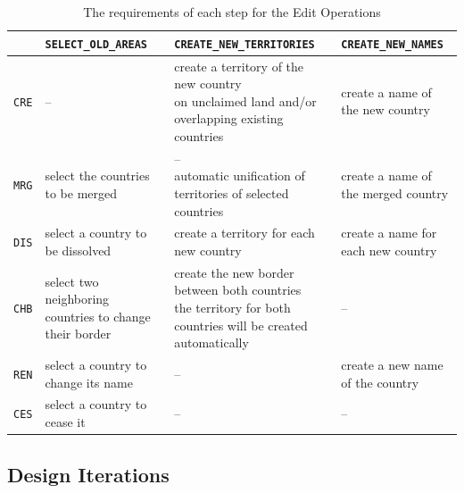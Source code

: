 \begin{table}[H]
\begin{center}
\begin{tabular}{m{0.9cm} m{4.0cm} m{4.4cm} m{3.8cm}}
  \toprule

  &
  \texttt{SELECT\_OLD\_AREAS} &
  \texttt{CREATE\_NEW\_TERRITORIES} &
  \texttt{CREATE\_NEW\_NAMES} \\

  \midrule
  \texttt{CRE} &
  -- &
  \pbox{4.4cm}{create a territory of the new country\\
  \footnotesize{on unclaimed land and/or overlapping existing countries}} &
  create a name of the new country \\

  \midrule
  \texttt{MRG} &
  select the countries to be merged &
  \pbox{4.4cm}{--\\
  \footnotesize{automatic unification of territories of selected countries}} &
  create a name of the merged country
  \\

  \midrule
  \texttt{DIS} &
  select a country to be \mbox{dissolved} &
  create a territory for each new country &
  create a name for each new country \\

  \midrule
  \texttt{CHB} &
  select two neighboring countries to change their border &
  \pbox{4.4cm}{create the new border between both countries \\
  \footnotesize{the territory for both countries will be created automatically}}  &
  -- \\

  \midrule
  \texttt{REN} &
  select a country to change its name &
  -- &
  create a new name of the country \\

  \midrule
  \texttt{CES} &
  select a country to cease it &
  -- &
  -- \\

  \bottomrule
\end{tabular}
\caption{The requirements of each step for the Edit Operations}
\label{tab:editoperations_in_worklow}
\end{center}
\end{table}


\subsection{Design Iterations} %
\label{sub:design_iterations}

